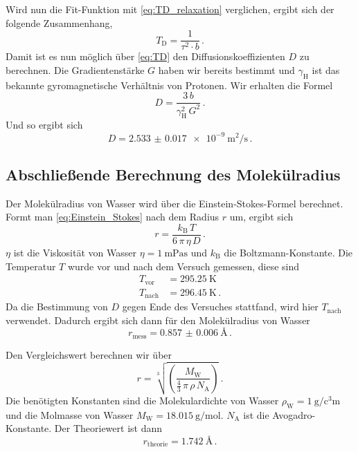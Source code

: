 Wird nun die Fit-Funktion mit \autoref{eq:TD_relaxation} verglichen, ergibt sich der folgende Zusammenhang,
\begin{equation}
    T_\text{D} = \frac{1}{\tau ^2 \cdot b} \, . 
    \label{eq:b_td}
\end{equation}
Damit ist es nun möglich über \autoref{eq:TD} den Diffusionskoeffizienten $D$ zu berechnen.
Die Gradientenstärke $G$ haben wir bereits bestimmt und $\gamma _\text{H}$ ist das bekannte gyromagnetische Verhältnis von Protonen.
Wir erhalten die Formel 
\begin{equation}
    D = \frac{3 \, b}{\gamma _\text{H}^2 \, G^2 } \, . 
    \label{eq:diffusion}
\end{equation}
Und so ergibt sich 
\begin{equation*}
    D = \SI{2.533(17)e-9}{\meter\squared\per\second} \, . 
    \label{eq:diffusion_wert}
\end{equation*}

\subsection{Abschließende Berechnung des Molekülradius}
\label{ssec:aus4}

Der Molekülradius von Wasser wird über die Einstein-Stokes-Formel berechnet.
Formt man \autoref{eq:Einstein_Stokes} nach dem Radius $r$ um, ergibt sich 
\begin{equation}
    r =  \frac{k_\text{B} \, T}{6 \, \pi \, \eta \, D } \, .
    \label{eq:stokes}
\end{equation}
$\eta$ ist die Viskosität von Wasser $\eta = \SI{1}{\milli\pascal\second} $ und $k_\text{B}$ die Boltzmann-Konstante. \cite{wasser}
Die Temperatur $T$ wurde vor und nach dem Versuch gemessen, diese sind 
\begin{align*}
    T_\text{vor} &= \SI{295.25}{\kelvin} \\
    T_\text{nach} &= \SI{296.45}{\kelvin} \, .
\end{align*}
Da die Bestimmung von $D$ gegen Ende des Versuches stattfand, wird hier $T_\text{nach}$ verwendet.
Dadurch ergibt sich dann für den Molekülradius von Wasser
\begin{equation*}
    r_\text{mess} = \SI{0.857(6)}{\angstrom}  \, .
    \label{eq:radius1}
\end{equation*}

Den Vergleichswert berechnen wir über
\begin{equation}
    r =  \sqrt[3]{ \left(  \frac{M_\text{W}}{\frac{4}{3} \, \pi \, \rho \, N_\text{A} }  \right)} \, .
    \label{eq:hexagonal}
\end{equation}
Die benötigten Konstanten sind die Molekulardichte von Wasser $\rho _\text{W} = \SI{1}{\gram\per\cubic\centi\meter}$ und die Molmasse von Wasser
$M _\text{W} = \SI{18.015}{\gram\per\mol}$. \cite{wasser}
$N_\text{A}$ ist die Avogadro-Konstante.
Der Theoriewert ist dann 
\begin{equation*}
    r_\text{theorie} = \SI{1.742}{\angstrom}  \, .
    \label{eq:radius2}
\end{equation*}
